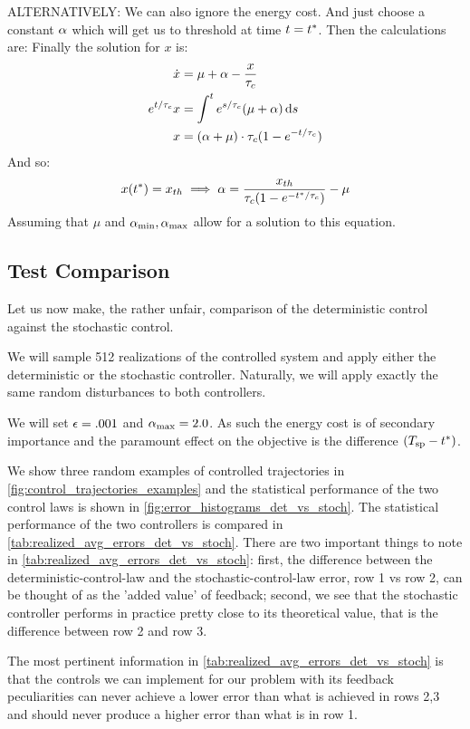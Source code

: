 \documentclass{article}
\begin{document}
ALTERNATIVELY:
We can also ignore the energy cost. And just choose a constant ${\alpha}$ which will
get us to threshold at time $t={ t^* }$. Then the calculations are:
Finally the solution for $x$ is:
\begin{align*}
\dot{x} & = {\mu } + {\alpha}  -  \frac{x}{{ \tau_{c} }}
\\
e^{t/{ \tau_{c} }}x &=  \int^t e^{s/{ \tau_{c} }}({\mu }+{\alpha}) \, \mathrm{d} s   
\\
x &= ( {\alpha} + {\mu })\cdot { \tau_{c} } (1 - e^{-t/{ \tau_{c} }}) 
\end{align*}
And so: 
$$
x({ t^* }) = { x_{th} } \implies {\alpha} = \frac{{ x_{th} }}{{ \tau_{c} }(1 - e^{-{ t^* }/{ \tau_{c} }})} - {\mu }$$  
Assuming that $\mu$ and ${ {\alpha}_{\textrm{min}} },{ {\alpha}_{\textrm{max}} }$ allow for a solution to this equation.
\subsection{Test Comparison}
\label{sec:deterministic_vs_feedback_numerical_test}
Let us  now make, the rather unfair, comparison of the deterministic control
against the stochastic control.

We will sample 512 realizations of the controlled system and apply either the
deterministic or the stochastic controller. Naturally, we will apply exactly
the same random disturbances to both controllers.

We will set ${\epsilon} = .001$ and ${ {\alpha}_{\textrm{max}} } = 2.0$. As such the energy cost is of
secondary importance and the paramount effect on the objective is the difference
$({ T_{\textrm{sp} } } - { t^* })$.
 
We show three random examples of controlled trajectories in
\cref{fig:control_trajectories_examples} and the statistical performance of the
two control laws is shown in \cref{fig:error_histograms_det_vs_stoch}. The
statistical performance of the two controllers is compared in
\cref{tab:realized_avg_errors_det_vs_stoch}. There are two important things to
note in \cref{tab:realized_avg_errors_det_vs_stoch}: first, the difference
between the deterministic-control-law and the stochastic-control-law error,
row 1 vs row 2, can be thought of as the 'added value' of feedback; second,
we see that the stochastic controller performs in practice pretty close to its
theoretical value, that is the difference between row 2 and row 3.  

The most pertinent information in 
\cref{tab:realized_avg_errors_det_vs_stoch} is that the controls we can
implement for our problem with its feedback peculiarities can never achieve a
lower error than what is achieved in rows 2,3 and should never produce a higher
error than what is in row 1.
 
\end{document}
